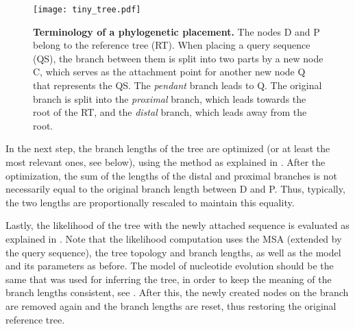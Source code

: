 \begin{figure}[pthb]
    \centering
    \texttt{[image: tiny\_tree.pdf]}
    \caption[Terminology of a phylogenetic placement]{
        \textbf{Terminology of a phylogenetic placement.}
        The nodes {\sffamily D} and {\sffamily P} belong to the reference tree (RT).
        When placing a query sequence (QS), the branch between them %
        is split into two parts by a new node {\sffamily C},
        which serves as the attachment point for another new node {\sffamily Q} that represents the QS.
        The \emph{pendant} branch leads to {\sffamily Q}.
        The original branch is split into the \emph{proximal} branch, which leads towards the root of the RT,
        and the \emph{distal} branch, which leads away from the root.
    }
    \label{fig:tiny_tree}
\end{figure}

In the next step, the branch lengths of the tree are optimized (or at least the most relevant ones, see below),
using the method as explained in .
After the optimization, the sum of the lengths of the distal and proximal branches is not necessarily equal
to the original branch length between {\sffamily D} and {\sffamily P}.
Thus, typically, the two lengths are proportionally rescaled to maintain this equality.

Lastly, the likelihood of the tree with the newly attached sequence is evaluated
as explained in .
Note that the likelihood computation uses the MSA (extended by the query sequence),
the tree topology and branch lengths, as well as the model and its parameters as before.
The model of nucleotide evolution should be the same that was used for inferring the tree,
in order to keep the meaning of the branch lengths consistent,
see .
After this, the newly created nodes on the branch are removed again and the branch lengths are reset,
thus restoring the original reference tree.

